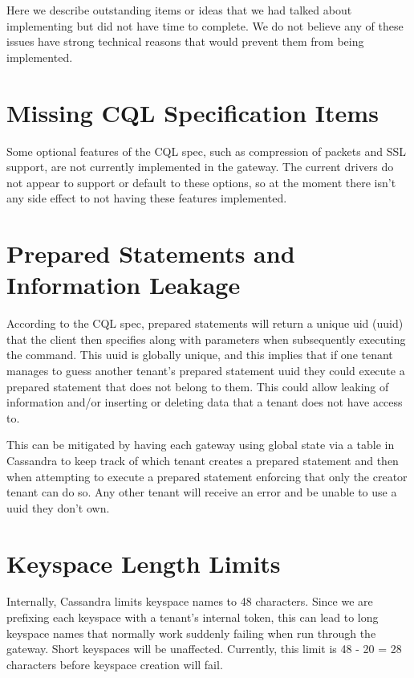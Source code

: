 \documentclass[11pt,notitlepage]{report}
\begin{document}
Here we describe outstanding items or ideas that we had talked about implementing but did not have time to complete. We do not believe any of these issues have strong technical reasons that would prevent them from being implemented.

\section*{Missing CQL Specification Items}

Some optional features of the CQL spec, such as compression of packets and SSL support, are not currently implemented in the gateway. The current drivers do not appear to support or default to these options, so at the moment there isn't any side effect to not having these features implemented.


\section*{Prepared Statements and Information Leakage}

According to the CQL spec, prepared statements will return a unique uid (uuid) that the client then specifies along with parameters when subsequently executing the command. This uuid is globally unique, and this implies that if one tenant manages to guess another tenant's prepared statement uuid they could execute a prepared statement that does not belong to them. This could allow leaking of information and/or inserting or deleting data that a tenant does not have access to.

This can be mitigated by having each gateway using global state via a table in Cassandra to keep track of which tenant creates a prepared statement and then when attempting to execute a prepared statement enforcing that only the creator tenant can do so. Any other tenant will receive an error and be unable to use a uuid they don't own.


\section*{Keyspace Length Limits}

Internally, Cassandra limits keyspace names to 48 characters. Since we are prefixing each keyspace with a tenant's internal token, this can lead to long keyspace names that normally work suddenly failing when run through the gateway. Short keyspaces will be unaffected. Currently, this limit is 48 - 20 = 28 characters before keyspace creation will fail.
\end{document}
